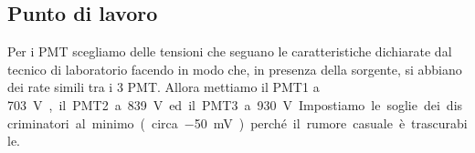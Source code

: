 \subsection{Punto di lavoro}

Per i PMT scegliamo delle tensioni che seguano le caratteristiche dichiarate dal tecnico di laboratorio facendo in modo che, in presenza della sorgente, si abbiano dei rate simili tra i 3 PMT.
Allora mettiamo il PMT1 a \SI{703}V, il PMT2 a \SI{839}V ed il PMT3 a \SI{930}V.

Impostiamo le soglie dei discriminatori al minimo (circa \SI{-50}{mV}) perché il rumore casuale è
trascurabile.

